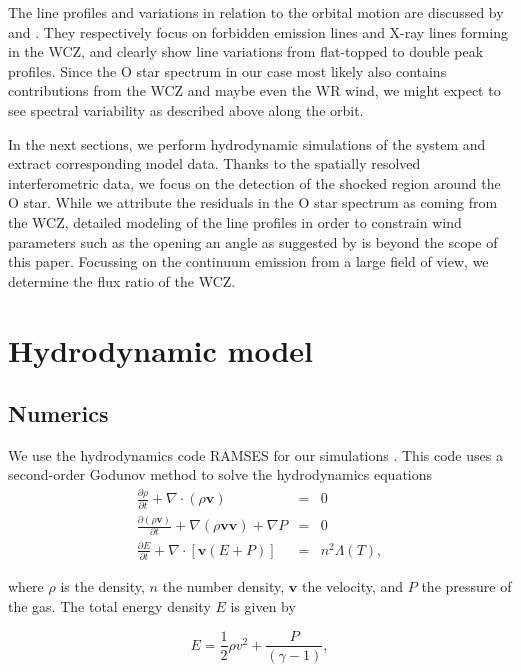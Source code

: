 \documentclass[usenatbib]{mnras}%
\begin{document}
The line profiles and variations in relation to the orbital motion are discussed by \citet{2009MNRAS.395..962I} and \citet{2003MNRAS.346..773H}. They respectively focus on forbidden emission lines and X-ray lines forming in the WCZ, and clearly show line variations from flat-topped to double peak profiles.  Since the O star spectrum in our case most likely also contains contributions from the WCZ and maybe even the WR wind, we might expect to see spectral variability as described above along the orbit.  

In the next sections, we perform hydrodynamic simulations of the system and extract corresponding model data.  Thanks to the spatially resolved interferometric data, we focus on the detection of the shocked region around the O star. While we attribute the residuals in the O star spectrum as coming from the WCZ, detailed modeling of the line profiles in order to constrain wind parameters such as the opening an angle as suggested by \citet{2009MNRAS.395..962I} is beyond the scope of this paper. Focussing on the continuum emission from a large field of view, we determine the flux ratio of the WCZ.


\section{Hydrodynamic model}\label{sec:model}
\subsection{Numerics}

We use the hydrodynamics code RAMSES for our simulations \citep{2002A&A...385..337T}. This code uses a second-order Godunov method to solve the hydrodynamics equations
\begin{eqnarray}\label{eq:hydro}
    \frac{\partial\rho}{\partial t}+\nabla \cdot(\rho \mathbf{v})&=&0\\  \nonumber
	\frac{\partial(\rho \mathbf{v})}{\partial t}+\nabla (\rho \mathbf{v}\mathbf{v})+\nabla P 	&=& 0	\\
	  \frac{\partial E }{\partial t}+\nabla \cdot[\mathbf{v}(E+P)]	&=& n^2 \Lambda(T),	\nonumber
\end{eqnarray}


where $\rho$ is the density, $n$ the number density, $\mathbf{v}$ the velocity, and $P$ the pressure of the gas. The total energy density $E$ is given by

\begin{equation}
E= \frac{1}{2}\rho v^2+\frac{P}{(\gamma -1)},
\end{equation}
\end{document}
